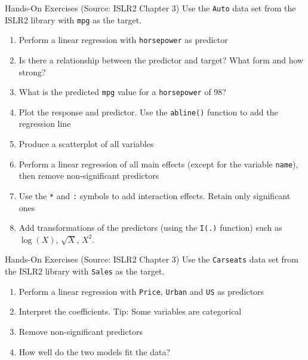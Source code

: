 \documentclass[ignorenonframetext,xcolor=x11names]{beamer}
\begin{document}
\begin{frame}{Hands-On Exercises}
{\small (Source: ISLR2 Chapter 3)}
\small
Use the \texttt{Auto} data set from the ISLR2 library with \texttt{mpg} as the target.
  \begin{enumerate}
     \item Perform a linear regression with \texttt{horsepower} as predictor
     \item Is there a relationship between the predictor and target? What form and how strong?
     \item What is the predicted \texttt{mpg} value for a \texttt{horsepower} of 98? 
     \item Plot the response and predictor. Use the \texttt{abline()} function to add the regression line
     \item Produce a scatterplot of all variables
     \item Perform a linear regression of all main effects (except for the variable \texttt{name}), then remove non-significant predictors
     \item Use the \texttt{*} and \texttt{:} symbols to add interaction effects. Retain only significant ones
     \item Add transformations of the predictors (using the \texttt{I(.)} function) such as $\log(X)$, $\sqrt{X}$, $X^2$.
  \end{enumerate}
\end{frame}

\begin{frame}{Hands-On Exercises}
{\small (Source: ISLR2 Chapter 3)}
\small
Use the \texttt{Carseats} data set from the ISLR2 library with \texttt{Sales} as the target.
  \begin{enumerate}
     \item Perform a linear regression with \texttt{Price}, \texttt{Urban} and \texttt{US} as predictors
     \item Interpret the coefficients. Tip: Some variables are categorical
     \item Remove non-significant predictors
     \item How well do the two models fit the data?
  \end{enumerate}
\end{frame}
\end{document}
